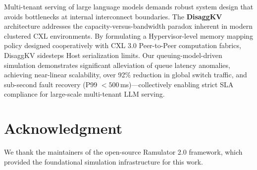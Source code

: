 \documentclass[10pt,conference]{IEEEtran}
\begin{document}
Multi-tenant serving of large language models demands robust system design that avoids bottlenecks at internal interconnect boundaries. The \textbf{DisaggKV} architecture addresses the capacity-versus-bandwidth paradox inherent in modern clustered CXL environments. By formulating a Hypervisor-level memory mapping policy designed cooperatively with CXL 3.0 Peer-to-Peer computation fabrics, DisaggKV sidesteps Host serialization limits. Our queuing-model-driven simulation demonstrates significant alleviation of queue latency anomalies, achieving near-linear scalability, over 92\% reduction in global switch traffic, and sub-second fault recovery (P99 $< 500$\,ms)---collectively enabling strict SLA compliance for large-scale multi-tenant LLM serving.

\section*{Acknowledgment}

We thank the maintainers of the open-source Ramulator 2.0 framework, which provided the foundational simulation infrastructure for this work.
\end{document}
